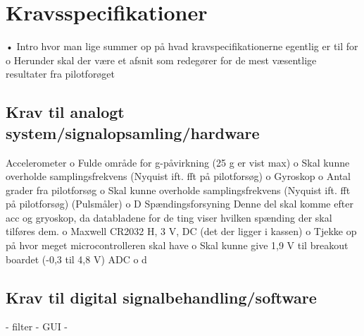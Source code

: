 \section{Kravsspecifikationer}
• Intro hvor man lige summer op på hvad kravspecifikationerne egentlig er til for
	o Herunder skal der være et afsnit som redegører for de mest væsentlige resultater fra pilotforøget

\subsection{Krav til analogt system/signalopsamling/hardware}
Accelerometer
	o Fulde område for g-påvirkning (25 g er vist max)
	o Skal kunne overholde samplingsfrekvens (Nyquist ift. fft på pilotforsøg)
	o	
Gyroskop
	o Antal grader fra pilotforsøg
	o Skal kunne overholde samplingsfrekvens (Nyquist ift. fft på pilotforsøg)
(Pulsmåler)
	o D
Spændingsforsyning
				Denne del skal komme efter acc og gryoskop, da databladene for de ting viser hvilken spænding der skal tilføres dem.
	o Maxwell CR2032 H, 3 V, DC (det der ligger i kassen)
	o Tjekke op på hvor meget microcontrolleren skal have
	o Skal kunne give 1,9 V til breakout boardet (-0,3 til 4,8 V)
ADC
	o d



\subsection{Krav til digital signalbehandling/software}
- filter
- GUI
 -
 


